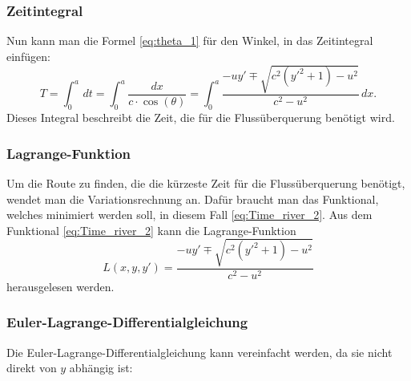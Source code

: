\subsubsection{Zeitintegral}

Nun kann man die Formel \eqref{eq:theta_1} für den Winkel, in das Zeitintegral einfügen:
\begin{equation}
    T = \int_0^a\,dt = \int_0^a\frac{dx}{c\cdot \cos(\theta)} = \int_0^a \frac{-uy' \mp \sqrt{c^2(y'^2+1)-u^2}}{c^2-u^2} \,dx.
    \label{eq:Time_river_2} 
\end{equation}
Dieses Integral beschreibt die Zeit, die für die Flussüberquerung benötigt wird. 



\subsubsection{Lagrange-Funktion} 
Um die Route zu finden, die die kürzeste Zeit für die Flussüberquerung
benötigt, wendet man die Variationsrechnung an. Dafür braucht man
das  Funktional, welches minimiert werden soll, in diesem Fall
\eqref{eq:Time_river_2}.
Aus dem Funktional \eqref{eq:Time_river_2} kann die Lagrange-Funktion
\begin{equation*}
    L(x, y, y') = \frac{-uy' \mp \sqrt{c^2(y'^2+1)-u^2}}{c^2-u^2}
\end{equation*}
herausgelesen werden. 

\subsubsection{Euler-Lagrange-Differentialgleichung}
Die Euler-Lagrange-Differentialgleichung kann vereinfacht werden,
da sie nicht direkt von \(y\) abhängig ist:

